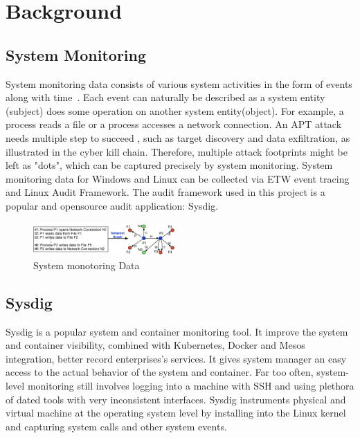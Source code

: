 \section{Background}
\subsection{System Monitoring}
System monitoring data consists of various system activities in the form of events along with time~\cite{backtracking, backtracking2, taser,wormlog}. Each event can naturally be described as a system entity (subject) does some operation on another system entity(object). For example, a process reads a file or a process accesses a network connection. An APT attack needs multiple step to succeed , such as target discovery and data exfiltration, as illustrated in the cyber kill chain\cite{killchain}. Therefore, multiple attack footprints might be left as "dots", which can be captured precisely by system monitoring. System monitoring data for Windows and Linux can be collected via ETW event tracing\cite{etw} and Linux Audit Framework\cite{auditd}. The audit framework used in this project is a popular and opensource audit application: Sysdig.
\begin{figure}
	\centering
	\includegraphics[width=0.48\textwidth]{temporal-graph.jpg}
	\caption{System monotoring Data}
	\label{fig:temporalGraph}
\end{figure}
\subsection{Sysdig}
Sysdig is a popular system and container monitoring tool. It improve the system and container visibility, combined with Kubernetes, Docker and Mesos integration, better record enterprises's services. It gives system manager an easy access to the actual behavior of the system and container. Far too often, system-level monitoring still involves logging into a machine with SSH and using plethora of dated tools with very inconsistent interfaces. Sysdig instruments physical and virtual machine at the operating system level by installing into the Linux kernel and capturing system calls and other system events.
